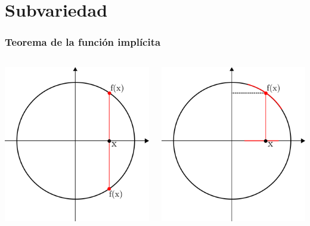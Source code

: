 \documentclass[spanish]{beamer}
\begin{document}
\section{Subvariedad}
\begin{frame}
    \frametitle{Teorema de la funci\'on impl\'icita}
    \begin{columns}
        \begin{center}
            \includegraphics[scale=0.3]{../gfx/unit-circle1}
        \end{center}
        \begin{center}
            \includegraphics[scale=0.3]{../gfx/unit-circle2}

\end{center}
\end{columns}
\end{frame}
\end{document}
